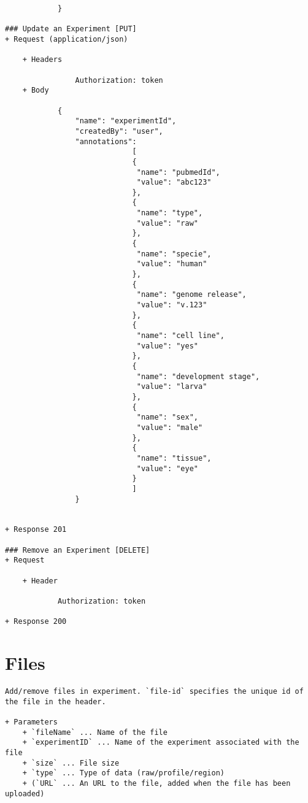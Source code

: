 \begin{verbatim}
            }

### Update an Experiment [PUT]
+ Request (application/json)

    + Headers
    
                Authorization: token
    + Body 
    
            {
                "name": "experimentId",
                "createdBy": "user",
                "annotations": 
                             [
                             {
                              "name": "pubmedId",
                              "value": "abc123"
                             }, 
                             {
                              "name": "type",
                              "value": "raw"
                             },
                             {
                              "name": "specie",
                              "value": "human"
                             },
                             {
                              "name": "genome release",
                              "value": "v.123"
                             },
                             {
                              "name": "cell line",
                              "value": "yes"
                             },
                             {
                              "name": "development stage",
                              "value": "larva"
                             },
                             {
                              "name": "sex",
                              "value": "male"
                             },
                             {
                              "name": "tissue",
                              "value": "eye"
                             }
                             ]
                }
            
        
+ Response 201

### Remove an Experiment [DELETE]
+ Request 

    + Header
    
            Authorization: token
        
+ Response 200
\end{verbatim}

\section*{Files}
\begin{verbatim}
Add/remove files in experiment. `file-id` specifies the unique id of 
the file in the header. 

+ Parameters
    + `fileName` ... Name of the file
    + `experimentID` ... Name of the experiment associated with the file
    + `size` ... File size
    + `type` ... Type of data (raw/profile/region)
    + (`URL` ... An URL to the file, added when the file has been uploaded)
\end{verbatim}

